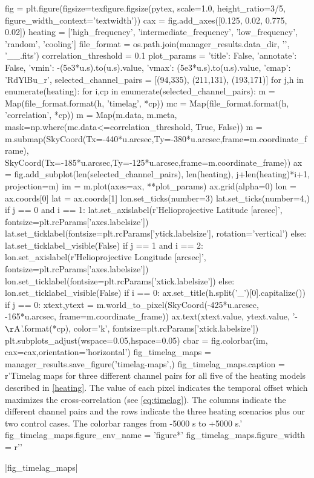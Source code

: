\begin{pycode}
fig = plt.figure(figsize=texfigure.figsize(pytex, scale=1.0, height_ratio=3/5,
                                           figure_width_context='textwidth'))
cax = fig.add_axes([0.125, 0.02, 0.775, 0.02])
heating = ['high_frequency', 'intermediate_frequency', 'low_frequency', 'random', 'cooling']
file_format = os.path.join(manager_results.data_dir, '{}', '{}_{}_{}.fits')
correlation_threshold = 0.1
plot_params = {'title': False, 'annotate': False, 'vmin': -(5e3*u.s).to(u.s).value,
               'vmax': (5e3*u.s).to(u.s).value, 'cmap': 'RdYlBu_r',}
selected_channel_pairs = [(94,335), (211,131), (193,171)]
for j,h in enumerate(heating):
    for i,cp in enumerate(selected_channel_pairs):
        m = Map(file_format.format(h, 'timelag', *cp))
        mc = Map(file_format.format(h, 'correlation', *cp))
        m = Map(m.data, m.meta, mask=np.where(mc.data<=correlation_threshold, True, False))
        m = m.submap(SkyCoord(Tx=-440*u.arcsec,Ty=-380*u.arcsec,frame=m.coordinate_frame),
                     SkyCoord(Tx=-185*u.arcsec,Ty=-125*u.arcsec,frame=m.coordinate_frame))
        ax = fig.add_subplot(len(selected_channel_pairs), len(heating), j+len(heating)*i+1,
                             projection=m)
        im = m.plot(axes=ax, **plot_params)
        ax.grid(alpha=0)
        lon = ax.coords[0]
        lat = ax.coords[1]
        lon.set_ticks(number=3)
        lat.set_ticks(number=4,) 
        if j == 0 and i == 1:
            lat.set_axislabel(r'Helioprojective Latitude [arcsec]', fontsize=plt.rcParams['axes.labelsize'])
            lat.set_ticklabel(fontsize=plt.rcParams['ytick.labelsize'], rotation='vertical')
        else:
            lat.set_ticklabel_visible(False)
        if j == 1 and i == 2:
            lon.set_axislabel(r'Helioprojective Longitude [arcsec]', fontsize=plt.rcParams['axes.labelsize'])
            lon.set_ticklabel(fontsize=plt.rcParams['xtick.labelsize'])
        else:
            lon.set_ticklabel_visible(False)
        if i == 0:
            ax.set_title(h.split('_')[0].capitalize())
        if j == 0:
            xtext,ytext = m.world_to_pixel(SkyCoord(-425*u.arcsec, -165*u.arcsec, frame=m.coordinate_frame))
            ax.text(xtext.value, ytext.value, '{}-{} $\mathrm{{\AA}}$'.format(*cp),
                    color='k', fontsize=plt.rcParams['xtick.labelsize'])
plt.subplots_adjust(wspace=0.05,hspace=0.05)
cbar = fig.colorbar(im, cax=cax,orientation='horizontal')
fig_timelag_maps = manager_results.save_figure('timelag-maps',)
fig_timelag_maps.caption = r'Timelag maps for three different channel pairs for all five of the heating models described in \autoref{heating}. The value of each pixel indicates the temporal offset which maximizes the cross-correlation (see \autoref{eq:timelag}). The columns indicate the different channel pairs and the rows indicate the three heating scenarios plus our two control cases. The colorbar ranges from -5000 s to +5000 s.'
fig_timelag_maps.figure_env_name = 'figure*'
fig_timelag_maps.figure_width = r'\textwidth' 
\end{pycode}
|fig_timelag_maps|

